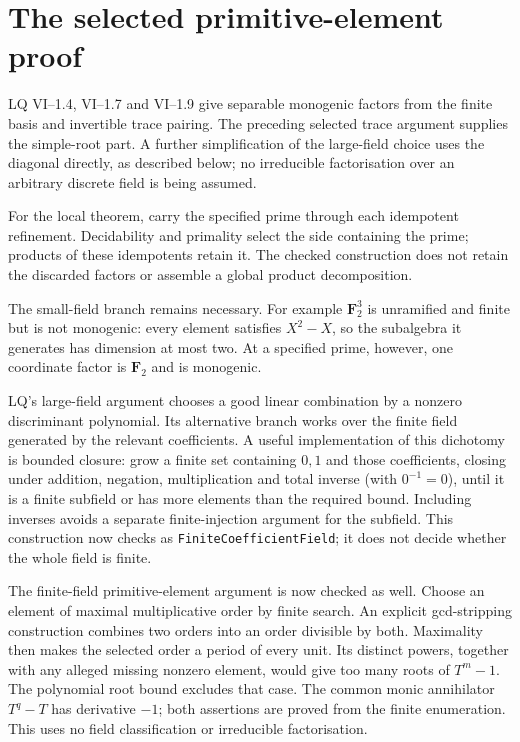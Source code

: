 \documentclass[11pt]{article}
\begin{document}
\section{The selected primitive-element proof}

LQ VI--1.4, VI--1.7 and VI--1.9 give separable monogenic factors from
the finite basis and invertible trace pairing. The preceding selected
trace argument supplies the simple-root part. A further simplification
of the large-field choice uses the diagonal directly, as
described below; no irreducible factorisation over an arbitrary discrete
field is being assumed.

For the local theorem, carry the specified prime through each
idempotent refinement. Decidability and primality select the side
containing the prime; products of these idempotents retain it.
The checked construction does not retain the discarded factors or
assemble a global product decomposition.

The small-field branch remains necessary.  For example
$\mathbf F_2^3$ is unramified and finite but is not monogenic:
every element satisfies $X^2-X$, so the subalgebra it generates has
dimension at most two.  At a specified prime, however, one coordinate
factor is $\mathbf F_2$ and is monogenic.

LQ's large-field argument chooses a good linear combination by a
nonzero discriminant polynomial.  Its alternative branch works over
the finite field generated by the relevant coefficients.  A useful
implementation of this dichotomy is bounded closure: grow a finite
set containing $0,1$ and those coefficients, closing under addition,
negation, multiplication and total inverse (with $0^{-1}=0$), until it
is a finite subfield or has more elements than the required bound.
Including inverses avoids a separate finite-injection argument for the
subfield. This construction now checks as \texttt{FiniteCoefficientField};
it does not decide whether the whole field is finite.

The finite-field primitive-element argument is now checked as well.
Choose an element of maximal multiplicative order by finite search.
An explicit gcd-stripping construction combines two orders into an
order divisible by both. Maximality then makes the selected order a
period of every unit. Its distinct powers, together with any alleged
missing nonzero element, would give too many roots of $T^m-1$.
The polynomial root bound excludes that case. The common monic
annihilator $T^q-T$ has derivative $-1$; both assertions are proved
from the finite enumeration. This uses no field classification or
irreducible factorisation.
\end{document}
